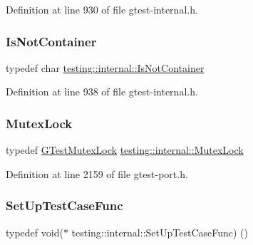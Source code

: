 Definition at line 930 of file gtest-\/internal.\+h.

\mbox{\label{namespacetesting_1_1internal_abf080521ce135deb510e0a7830fd3d33}} 
\subsubsection{\texorpdfstring{Is\+Not\+Container}{IsNotContainer}}
{\footnotesize\ttfamily typedef char \hyperlink{namespacetesting_1_1internal_abf080521ce135deb510e0a7830fd3d33}{testing\+::internal\+::\+Is\+Not\+Container}}



Definition at line 938 of file gtest-\/internal.\+h.

\mbox{\label{namespacetesting_1_1internal_a08b187c6cc4e28400aadf9a32fccc8de}} 
\subsubsection{\texorpdfstring{Mutex\+Lock}{MutexLock}}
{\footnotesize\ttfamily typedef \hyperlink{classtesting_1_1internal_1_1GTestMutexLock}{G\+Test\+Mutex\+Lock} \hyperlink{namespacetesting_1_1internal_a08b187c6cc4e28400aadf9a32fccc8de}{testing\+::internal\+::\+Mutex\+Lock}}



Definition at line 2159 of file gtest-\/port.\+h.

\mbox{\label{namespacetesting_1_1internal_a30037044c0b57cdd647c7e2e97cb2cff}} 
\subsubsection{\texorpdfstring{Set\+Up\+Test\+Case\+Func}{SetUpTestCaseFunc}}
{\footnotesize\ttfamily typedef void($\ast$ testing\+::internal\+::\+Set\+Up\+Test\+Case\+Func) ()}



